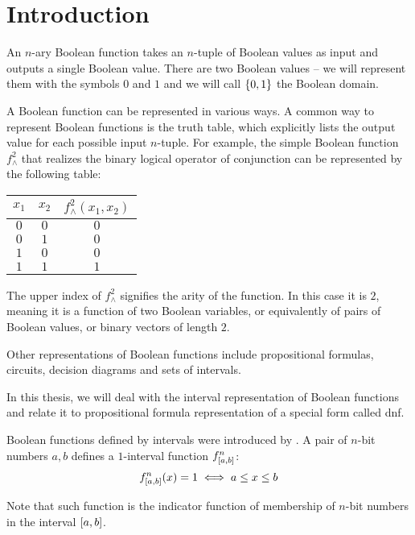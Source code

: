 \chapter*{Introduction}

An $n$-ary Boolean function takes an $n$-tuple of Boolean values as input
and outputs a single Boolean value.
There are two Boolean values
-- we will represent them with the symbols $0$ and $1$
and we will call $\{0, 1\}$ the Boolean domain.

A Boolean function can be represented in various ways.
A common way to represent Boolean functions
is the truth table,
which explicitly lists the output value for each possible input $n$-tuple.
For example,
the simple Boolean function $f^2_{\wedge}$ that realizes the binary logical operator of conjunction
can be represented by the following table:
\begin{center}
\begin{tabular}{cc|c}
$x_1$ & $x_2$ & $f^2_{\wedge}(x_1, x_2)$ \\
\hline
$0$ & $0$ & $0$ \\
$0$ & $1$ & $0$ \\
$1$ & $0$ & $0$ \\
$1$ & $1$ & $1$ \\
\end{tabular}
\end{center}

The upper index of $f^2_{\wedge}$
signifies the arity of the function.
In this case it is $2$,
meaning it is a function of two Boolean variables,
or equivalently of pairs of Boolean values,
or binary vectors of length $2$.

Other representations of Boolean functions
include
propositional formulas,
circuits,
decision diagrams
and sets of intervals.

In this thesis,
we will deal with the interval representation of Boolean functions
and relate it to propositional formula representation of a special form called \acrlong{dnf}.

Boolean functions defined by intervals were introduced
by \citet{Schieber2005154}.
A pair of $n$-bit numbers $a, b$
defines a $1$-interval function
$f^{n}_{[a, b]}$:
$$
f^{n}_{[a, b]} (x) = 1
\iff a \leq x \leq b
$$

Note that such function is the indicator function
of membership of $n$-bit numbers
in the interval $[a, b]$.

